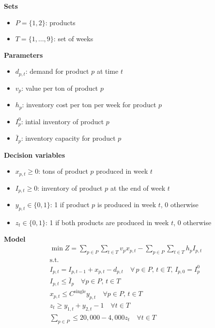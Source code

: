 \documentclass[10pt]{article}
\begin{document}
\textbf{Sets}
\begin{itemize}
    \item $P = \{1, 2\} $: products
    \item $T = \{1, \dots, 9\} $: set of weeks 
\end{itemize}
\textbf{Parameters}
\begin{itemize}
    \item $d_{p, t} $: demand for product $p $ at time $t $
    \item $v_p $: value per ton of product $ p $
    \item $h_p $: inventory cost per ton per week for product $p $
    \item $I_p^0 $: intial inventory of product $p $
    \item $\bar{I}_p $: inventory capacity for product $p $
\end{itemize}
\textbf{Decision variables}
\begin{itemize}
    \item $x_{p, t} \ge 0$: tons of product $p $ produced in week $t $
    \item $I_{p, t} \ge 0 $: inventory of product $p $ at the end of week $t $
    \item $y_{p, t} \in \{0, 1\} $: 1 if product $p $ is produced in week $t $, 0 otherwise 
    \item $z_t \in \{0, 1\} $: 1 if both products are produced in week $t $, 0 otherwise
\end{itemize}
\newpage 
\textbf{Model}
\begin{gather*}
    \min Z = \sum_{p\in P}\sum_{t\in T}v_p x_{p, t} - \sum_{p\in P}\sum_{t\in T}h_pI_{p, t}\\
    \text{s.t.}\\
    I_{p, t} = I_{p, t - 1} + x_{p, t} - d_{p, t}\quad\forall\, p\in P,\, t\in T,\, I_{p, 0} = I_p^0\\
    I_{p, t}\le \bar{I}_p\quad\forall p\in P,\, t\in T\\
    x_{p, t} \le C^\text{single}y_{p, t}\quad\forall p\in P,\, t\in T\\
    z_t \ge y_{1, t} + y_{2, t} - 1\quad\forall t\in T\\
    \sum_{p\in P}\le 20,000 - 4,000 z_t \quad\forall t\in T\\
\end{gather*}
\end{document}
